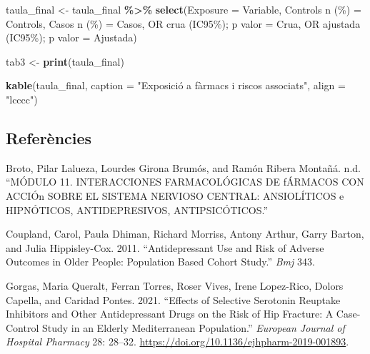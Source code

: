 \documentclass[
]{article}
\newenvironment{Shaded}{\begin{snugshade}}{\end{snugshade}}
\newcommand{\AttributeTok}[1]{\textcolor[rgb]{0.13,0.29,0.53}{#1}}
\newcommand{\FunctionTok}[1]{\textcolor[rgb]{0.13,0.29,0.53}{\textbf{#1}}}
\newcommand{\NormalTok}[1]{#1}
\newcommand{\OtherTok}[1]{\textcolor[rgb]{0.56,0.35,0.01}{#1}}
\newcommand{\SpecialCharTok}[1]{\textcolor[rgb]{0.81,0.36,0.00}{\textbf{#1}}}
\newcommand{\StringTok}[1]{\textcolor[rgb]{0.31,0.60,0.02}{#1}}
\newlength{\cslhangindent}
\newenvironment{CSLReferences}[2] %
 {\begin{list}{}{%
  \setlength{\itemindent}{0pt}
  \setlength{\leftmargin}{0pt}
  \setlength{\parsep}{0pt}
  \ifodd #1
   \setlength{\leftmargin}{\cslhangindent}
   \setlength{\itemindent}{-1\cslhangindent}
  \fi
  \setlength{\itemsep}{#2\baselineskip}}}
 {\end{list}}
\begin{document}
\begin{Shaded}
\begin{Highlighting}[]
\NormalTok{taula\_final }\OtherTok{\textless{}{-}}\NormalTok{ taula\_final }\SpecialCharTok{\%\textgreater{}\%}
  \FunctionTok{select}\NormalTok{(}\AttributeTok{Exposure =}\NormalTok{ Variable,}
         \StringTok{\textasciigrave{}}\AttributeTok{Controls n (\%)}\StringTok{\textasciigrave{}} \OtherTok{=}\NormalTok{ Controls,}
         \StringTok{\textasciigrave{}}\AttributeTok{Casos n (\%)}\StringTok{\textasciigrave{}} \OtherTok{=}\NormalTok{ Casos,}
         \StringTok{\textasciigrave{}}\AttributeTok{OR crua (IC95\%); p valor}\StringTok{\textasciigrave{}} \OtherTok{=}\NormalTok{ Crua,}
         \StringTok{\textasciigrave{}}\AttributeTok{OR ajustada (IC95\%); p valor}\StringTok{\textasciigrave{}} \OtherTok{=}\NormalTok{ Ajustada)}

\NormalTok{tab3 }\OtherTok{\textless{}{-}} \FunctionTok{print}\NormalTok{(taula\_final)}
\end{Highlighting}
\end{Shaded}

\begin{Shaded}
\begin{Highlighting}[]
\FunctionTok{kable}\NormalTok{(taula\_final, }\AttributeTok{caption =} \StringTok{"Exposició a fàrmacs i riscos associats"}\NormalTok{, }\AttributeTok{align =} \StringTok{"lcccc"}\NormalTok{)}
\end{Highlighting}
\end{Shaded}

\clearpage

\subsection*{Referències}\label{referuxe8ncies}

\label{refs}
\begin{CSLReferences}{1}{0}
Broto, Pilar Lalueza, Lourdes Girona Brumós, and Ramón Ribera Montañá.
n.d. {``M{Ó}DULO 11. INTERACCIONES FARMACOL{Ó}GICAS DE f{Á}RMACOS CON
ACCI{Ó}n SOBRE EL SISTEMA NERVIOSO CENTRAL: ANSIOL{Í}TICOS e
HIPN{Ó}TICOS, ANTIDEPRESIVOS, ANTIPSIC{Ó}TICOS.''}

Coupland, Carol, Paula Dhiman, Richard Morriss, Antony Arthur, Garry
Barton, and Julia Hippisley-Cox. 2011. {``Antidepressant Use and Risk of
Adverse Outcomes in Older People: Population Based Cohort Study.''}
\emph{Bmj} 343.

Gorgas, Maria Queralt, Ferran Torres, Roser Vives, Irene Lopez-Rico,
Dolors Capella, and Caridad Pontes. 2021. {``Effects of Selective
Serotonin Reuptake Inhibitors and Other Antidepressant Drugs on the Risk
of Hip Fracture: A Case-Control Study in an Elderly Mediterranean
Population.''} \emph{European Journal of Hospital Pharmacy} 28: 28--32.
\url{https://doi.org/10.1136/ejhpharm-2019-001893}.

\end{CSLReferences}
\end{document}
